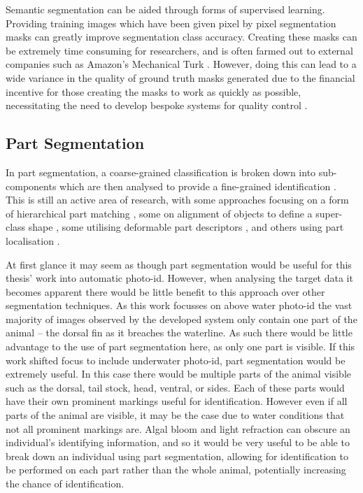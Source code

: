 Semantic segmentation can be aided through forms of supervised learning. Providing training images which have been given pixel by pixel segmentation masks can greatly improve segmentation class accuracy. Creating these masks can be extremely time consuming for researchers, and is often farmed out to external companies such as Amazon's Mechanical Turk \cite{buhrmester_amazons_2011}. However, doing this can lead to a wide variance in the quality of ground truth masks generated due to the financial incentive for those creating the masks to work as quickly as possible, necessitating the need to develop bespoke systems for quality control \cite{maji_large_2011}.

\subsection{Part Segmentation}\label{ch:Background,sec:Fine-grainedCV,sub:PartSegmentation}

In part segmentation, a coarse-grained classification is broken down into sub-components which are then analysed to provide a fine-grained identification \cite{zhang_part-based_2014}. This is still an active area of research, with some approaches focusing on a form of hierarchical part matching \cite{xie_hierarchical_2013}, some on alignment of objects to define a super-class shape \cite{gavves_fine-grained_2013}, some utilising deformable part descriptors \cite{zhang_deformable_2013}, and others using part localisation \cite{liu_dog_2012}.

At first glance it may seem as though part segmentation would be useful for this thesis' work into automatic photo-id. However, when analysing the target data it becomes apparent there would be little benefit to this approach over other segmentation techniques. As this work focusses on above water photo-id the vast majority of images observed by the developed system only contain one part of the animal -- the dorsal fin as it breaches the waterline.  As such there would be little advantage to the use of part segmentation here, as only one part is visible. If this work shifted focus to include underwater photo-id, part segmentation would be extremely useful. In this case there would be multiple parts of the animal visible such as the dorsal, tail stock, head, ventral, or sides. Each of these parts would have their own prominent markings useful for identification. However even if all parts of the animal are visible, it may be the case due to water conditions that not all prominent markings are. Algal bloom and light refraction can obscure an individual's identifying information, and so it would be very useful to be able to break down an individual using part segmentation, allowing for identification to be performed on each part rather than the whole animal, potentially increasing the chance of identification.  

